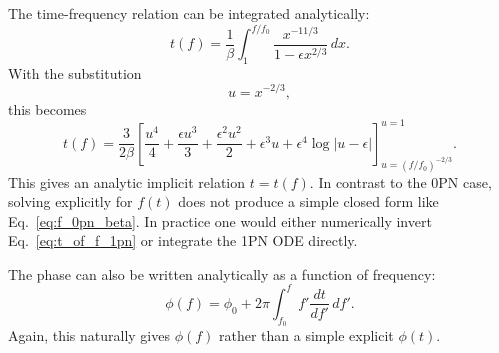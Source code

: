 \documentclass[11pt]{article}
\begin{document}
The time-frequency relation can be integrated analytically:
\begin{equation}
    t(f)
    =
    \frac{1}{\beta}
    \int_1^{f/f_0}
    \frac{x^{-11/3}}{1-\epsilon x^{2/3}}\,dx .
\end{equation}
With the substitution
\begin{equation}
    u = x^{-2/3},
\end{equation}
this becomes
\begin{equation}
    t(f)
    =
    \frac{3}{2\beta}
    \left[
      \frac{u^4}{4}
      + \frac{\epsilon u^3}{3}
      + \frac{\epsilon^2 u^2}{2}
      + \epsilon^3 u
      + \epsilon^4 \log|u-\epsilon|
    \right]_{u=(f/f_0)^{-2/3}}^{u=1}.
    \label{eq:t_of_f_1pn}
\end{equation}
This gives an analytic implicit relation $t=t(f)$. In contrast to the 0PN
case, solving explicitly for $f(t)$ does not produce a simple closed form like
Eq.~\eqref{eq:f_0pn_beta}. In practice one would either numerically invert
Eq.~\eqref{eq:t_of_f_1pn} or integrate the 1PN ODE directly.

The phase can also be written analytically as a function of frequency:
\begin{equation}
    \phi(f)
    =
    \phi_0
    +
    2\pi
    \int_{f_0}^{f}
    f'
    \frac{dt}{df'}\,df'.
\end{equation}
Again, this naturally gives $\phi(f)$ rather than a simple explicit
$\phi(t)$.
\end{document}
